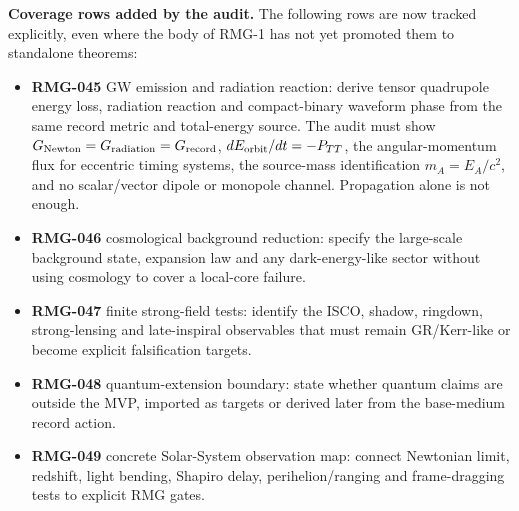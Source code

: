 \documentclass[11pt]{article}
\begin{document}
\medskip\noindent\textbf{Coverage rows added by the audit.}
The following rows are now tracked explicitly, even where the body of RMG-1 has
not yet promoted them to standalone theorems:
\begin{itemize}
\item \textbf{RMG-045} GW emission and radiation reaction: derive tensor
quadrupole energy loss, radiation reaction and compact-binary waveform phase
from the same record metric and total-energy source.  The audit must show
\(G_{\rm Newton}=G_{\rm radiation}=G_{\rm record}\),
\(dE_{\rm orbit}/dt=-P_{TT}\), the angular-momentum flux for eccentric timing
systems, the source-mass identification \(m_A=E_A/c^2\), and no scalar/vector
dipole or monopole channel.  Propagation alone is not enough.
\item \textbf{RMG-046} cosmological background reduction: specify the
large-scale background state, expansion law and any dark-energy-like sector
without using cosmology to cover a local-core failure.
\item \textbf{RMG-047} finite strong-field tests: identify the ISCO, shadow,
ringdown, strong-lensing and late-inspiral observables that must remain
GR/Kerr-like or become explicit falsification targets.
\item \textbf{RMG-048} quantum-extension boundary: state whether quantum
claims are outside the MVP, imported as targets or derived later from the
base-medium record action.
\item \textbf{RMG-049} concrete Solar-System observation map: connect
Newtonian limit, redshift, light bending, Shapiro delay, perihelion/ranging
and frame-dragging tests to explicit RMG gates.
\end{itemize}
\end{document}
